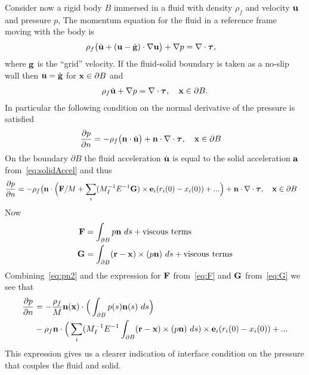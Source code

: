 Consider now a rigid body $B$ immersed in a fluid with density $\rho_f$ and velocity $\mathbf{ u}$ and pressure $p$,
The momentum equation for the fluid in a reference frame moving with the body is 
\begin{align*}
  \rho_f \big( \dot{\mathbf{ u}} + (\mathbf{ u}-\dot{\mathbf{ g}})\cdot\nabla\mathbf{ u} \big)+ \nabla p &= \nabla\cdot\boldsymbol{\tau} ,
\end{align*}
where $\mathbf{ g}$ is the ``grid'' velocity.
If the fluid-solid boundary is taken as a  no-slip wall then $\mathbf{ u}=\dot{\mathbf{ g}}$ for $\mathbf{ x} \in \partial B$ and
\begin{align}
  \rho_f \dot{\mathbf{ u}} + \nabla p = \nabla\cdot\boldsymbol{\tau} ,\quad \mathbf{ x}\in\partial B .
\end{align}
In particular the following condition on the normal
derivative of the pressure is satisfied
\begin{align}
  {\partial p\over\partial n} &= - \rho_f \big( \mathbf{ n}\cdot\dot{\mathbf{ u}} \big) + \mathbf{ n}\cdot\nabla\cdot\boldsymbol{\tau} ,\quad \mathbf{ x}\in\partial B
     \label{eq:pn}
\end{align}
On the boundary $\partial B$ the fluid acceleration $\dot{\mathbf{ u}}$ is equal to the solid acceleration $\mathbf{ a}$ from~\eqref{eq:solidAccel}
and thus 
\begin{align}
  {\partial p\over\partial n} &= - \rho_f \big( \mathbf{ n}\cdot\Big( \mathbf{ F}/M +\sum_i  (M_I^{-1} E^{-1}\mathbf{ G})\times\mathbf{ e}_i (r_i(0)-x_i(0))
             + ... \Big)    + \mathbf{ n}\cdot\nabla\cdot\boldsymbol{\tau} ,\quad \mathbf{ x}\in\partial B
     \label{eq:pn2}
\end{align}
Now
\begin{align}
  \mathbf{ F} &= \int_{\partial B} p \mathbf{ n} ~ds + \text{viscous terms} \label{eq:F}\\
  \mathbf{ G} &= \int_{\partial B} (\mathbf{ r}-\mathbf{ x})\times(p \mathbf{ n}) ~ds + \text{viscous terms} \label{eq:G}
\end{align}
Combining~\eqref{eq:pn2} and the expression for $\mathbf{ F}$ from~\eqref{eq:F} and $\mathbf{ G}$ from~\eqref{eq:G} we see that
\begin{align}
  {\partial p\over\partial n} &= - {\rho_f\over M} \mathbf{ n}(\mathbf{ x}) \cdot\Big( \int_{\partial B} p(s) \mathbf{ n}(s) ~ds \Big) \\
          &-  \rho_f \mathbf{ n}\cdot\Big( \sum_i  (M_I^{-1} E^{-1}\int_{\partial B} (\mathbf{ r}-\mathbf{ x})\times(p \mathbf{ n}) ~ds )\times\mathbf{ e}_i (r_i(0)-x_i(0))  + ...
   \label{eq:pCoupled}
\end{align}
This expression gives us a clearer indication of interface condition on the pressure that couples the fluid and solid.

